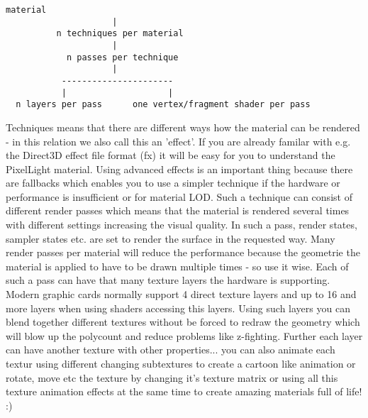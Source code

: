 \begin{lstlisting}[caption=PixelLight material system overview]
                  material
                     |
          n techniques per material
                     |
            n passes per technique
                     |
           ----------------------
           |                    |
  n layers per pass      one vertex/fragment shader per pass
\end{lstlisting}

Techniques means that there are different ways how the material can be rendered - in this relation we 
also call this an 'effect'. If you are already familar with e.g. the Direct3D effect file format (fx) it will be
easy for you to understand the PixelLight material. Using advanced effects is an important thing because there
are fallbacks which enables you to use a simpler technique if the hardware or performance is insufficient or for 
material LOD. Such a technique can consist of different render passes which means that the material is rendered 
several times with different settings increasing the visual quality. In such a pass, render states, sampler states 
etc. are set to render the surface in the requested way.
Many render passes per material will reduce the performance because the geometrie the material
is applied to have to be drawn multiple times - so use it wise. Each of such a pass can have that
many texture layers the hardware is supporting. Modern graphic cards normally support 4 direct texture
layers and up to 16 and more layers when using shaders accessing this layers. Using such layers you can
blend together different textures without be forced to redraw the geometry which will blow up the
polycount and reduce problems like z-fighting. Further each layer can have another texture with other properties... 
you can also animate each textur using different changing subtextures to create a cartoon like animation or rotate, 
move etc the texture by changing it's texture matrix or using all this texture animation effects at the same time
to create amazing materials full of life! :)\\


